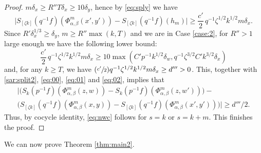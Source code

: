 \documentclass[JEP,XML,SOM,Unicode,NoEqCountersInSection]{cedram}
\newcounter{case}
\newcommand{\Psfrac}[2]{(\sfrac{#1}{#2})}
\theoremstyle{definition}
\theoremstyle{plain}
\begin{document}
\begin{proof}
$m\delta_x \geq R'' T \delta_x \geq 10 \delta_y$, hence by \eqref{eq:sply} we have
\begin{equation}\label{eq:00}
\bigl|S_{[\zeta k]}(q^{-1}f)(\Phi_{\alpha,\beta}^m(x',y'))-S_{[\zeta k]}(q^{-1}f)(h_m)\bigr|\geq \frac{c'}{2}\,q^{-1}\zeta^{1/2}k^{1/2}m\delta_x.
\end{equation}
Since $R'\delta_x^{1/3} \geq \delta_y$, $m\geq R'' \max(k,T)$ and we are in Case \ref{case:2}, for $R''>1$ large enough we have
the following lower bound:
\[
\frac{c'}{2}\,q^{-1}\zeta^{1/2}k^{1/2}m\delta_x\geq 10\max(C'p^{-1}k^{1/2}\delta_w,q^{-1}\zeta^{3/2}C'k^{3/2}\delta_x)
\]
and, for any $k\geq T$, we have $\Psfrac{c'}{2}q^{-1}\zeta^{1/2}k^{1/2}m\delta_x\geq d'''>0$.
This, together with \eqref{sar:split2}, \eqref{eq:00}, \eqref{eq:01} and \eqref{eq:02}, implies that
\begin{multline*}
\bigl|\bigl(S_k(p^{-1}f)(\Phi_{\alpha,\beta}^m(z,w))-S_k(p^{-1}f)(\Phi_{\alpha,\beta}^m(z,w'))\bigr)-\\
\bigl(S_{[\zeta k]}(q^{-1}f)(\Phi_{\alpha,\beta}^m(x,y))-S_{[\zeta k]}(q^{-1}f)(\Phi_{\alpha,\beta}^m(x',y'))\bigr)\bigr|\geq d'''/2.
\end{multline*}
Thus, by cocycle identity, \eqref{eq:nwc} follows for $s=k$ or $s=k+m$.
This finishes the proof.
\end{proof}

We can now prove Theorem \ref{thm:main2}.
\end{document}

